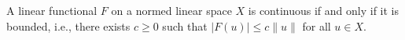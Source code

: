 A linear functional $F$ on a normed linear space $X$ is continuous if and only if it is bounded, i.e., there exists $c \geq 0$ such that $|F(u)| \leq c \|u\|$ for all $u \in X$.
